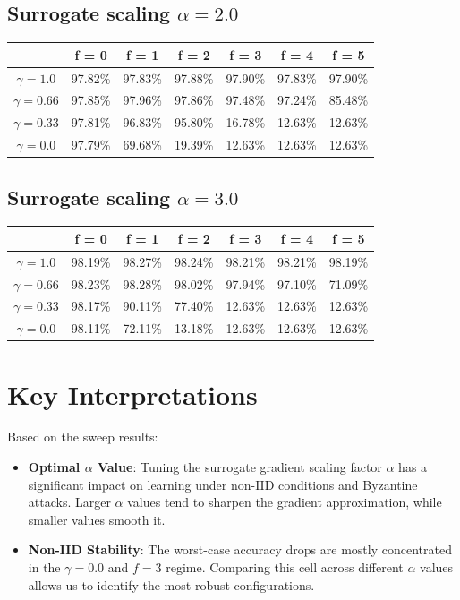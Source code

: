 \documentclass{article}
\begin{document}
\subsection{Surrogate scaling $\alpha = 2.0$}
\begin{table}[htbp]
    \centering
    \begin{tabular}{ccccccc}
        \toprule
        & \textbf{f = 0} & \textbf{f = 1} & \textbf{f = 2} & \textbf{f = 3} & \textbf{f = 4} & \textbf{f = 5} \\
        \midrule
        $\gamma = 1.0$ & 97.82\% & 97.83\% & 97.88\% & 97.90\% & 97.83\% & 97.90\% \\
        $\gamma = 0.66$ & 97.85\% & 97.96\% & 97.86\% & 97.48\% & 97.24\% & 85.48\% \\
        $\gamma = 0.33$ & 97.81\% & 96.83\% & 95.80\% & 16.78\% & 12.63\% & 12.63\% \\
        $\gamma = 0.0$ & 97.79\% & 69.68\% & 19.39\% & 12.63\% & 12.63\% & 12.63\% \\
        \bottomrule
    \end{tabular}
\end{table}
\subsection{Surrogate scaling $\alpha = 3.0$}
\begin{table}[htbp]
    \centering
    \begin{tabular}{ccccccc}
        \toprule
        & \textbf{f = 0} & \textbf{f = 1} & \textbf{f = 2} & \textbf{f = 3} & \textbf{f = 4} & \textbf{f = 5} \\
        \midrule
        $\gamma = 1.0$ & 98.19\% & 98.27\% & 98.24\% & 98.21\% & 98.21\% & 98.19\% \\
        $\gamma = 0.66$ & 98.23\% & 98.28\% & 98.02\% & 97.94\% & 97.10\% & 71.09\% \\
        $\gamma = 0.33$ & 98.17\% & 90.11\% & 77.40\% & 12.63\% & 12.63\% & 12.63\% \\
        $\gamma = 0.0$ & 98.11\% & 72.11\% & 13.18\% & 12.63\% & 12.63\% & 12.63\% \\
        \bottomrule
    \end{tabular}
\end{table}

\section{Key Interpretations}
Based on the sweep results:
\begin{itemize}
    \item \textbf{Optimal $\alpha$ Value}: Tuning the surrogate gradient scaling factor $\alpha$ has a significant impact on learning under non-IID conditions and Byzantine attacks. Larger $\alpha$ values tend to sharpen the gradient approximation, while smaller values smooth it.
    \item \textbf{Non-IID Stability}: The worst-case accuracy drops are mostly concentrated in the $\gamma = 0.0$ and $f = 3$ regime. Comparing this cell across different $\alpha$ values allows us to identify the most robust configurations.
\end{itemize}
\end{document}
